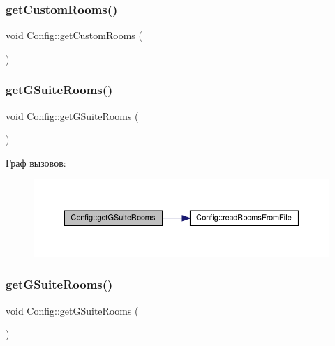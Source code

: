 \subsubsection{\texorpdfstring{get\+Custom\+Rooms()}{getCustomRooms()}\hspace{0.1cm}{\footnotesize\ttfamily [2/2]}}
{\footnotesize\ttfamily void Config\+::get\+Custom\+Rooms (\begin{DoxyParamCaption}{ }\end{DoxyParamCaption})\hspace{0.3cm}{\ttfamily [private]}}

\mbox{\label{class_config_a8a710b2b2b1e6280195389e9f84d0fba}} 
\subsubsection{\texorpdfstring{get\+G\+Suite\+Rooms()}{getGSuiteRooms()}\hspace{0.1cm}{\footnotesize\ttfamily [1/2]}}
{\footnotesize\ttfamily void Config\+::get\+G\+Suite\+Rooms (\begin{DoxyParamCaption}{ }\end{DoxyParamCaption})\hspace{0.3cm}{\ttfamily [private]}}

Граф вызовов\+:\nopagebreak
\begin{figure}[H]
\begin{center}
\leavevmode
\includegraphics[width=350pt]{class_config_a8a710b2b2b1e6280195389e9f84d0fba_cgraph}
\end{center}
\end{figure}
\mbox{\label{class_config_a8a710b2b2b1e6280195389e9f84d0fba}} 
\subsubsection{\texorpdfstring{get\+G\+Suite\+Rooms()}{getGSuiteRooms()}\hspace{0.1cm}{\footnotesize\ttfamily [2/2]}}
{\footnotesize\ttfamily void Config\+::get\+G\+Suite\+Rooms (\begin{DoxyParamCaption}{ }\end{DoxyParamCaption})\hspace{0.3cm}{\ttfamily [private]}}

